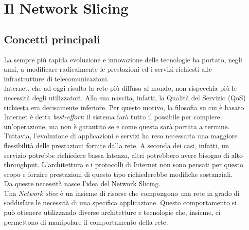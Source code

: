 \chapter{Il Network Slicing}\label{ch:capitolo1}

\section{Concetti principali}\label{ch:1.1}
La sempre più rapida evoluzione e innovazione delle tecnologie ha portato, negli anni, a modificare radicalmente le prestazioni ed i servizi richiesti alle infrastrutture di telecomunicazioni.\\
Internet, che ad oggi risulta la rete più diffusa al mondo, non rispecchia più le necessità  degli utilizzatori. Alla sua nascita, infatti, la Qualità del Servizio (QoS) richiesta era decisamente inferiore. Per questo motivo, la filosofia su cui è basato Internet è detta \textit{best-effort}: il sistema farà tutto il possibile per compiere un'operazione, ma non è garantito se e come questa sarà portata a termine.\\
Tuttavia, l'evoluzione di applicazioni e servizi ha reso necessaria una maggiore flessibilità delle prestazioni fornite dalla rete. A seconda dei casi, infatti, un servizio potrebbe richiedere bassa latenza, altri potrebbero avere bisogno di alto throughput. L'architettura e i protocolli di Internet non sono pensati per questo scopo e fornire prestazioni di questo tipo richiederebbe modifiche sostanziali.
\cite{libro1}\\
Da queste necessità nasce l'idea del Network Slicing.\\
Una \textit{Network slice} è un insieme di risorse che compongono una rete in grado di soddisfare le necessità di una specifica applicazione. Questo comportamento si può ottenere utilizzando diverse architetture e tecnologie che, insieme, ci permettono di manipolare il comportamento della rete.\\

